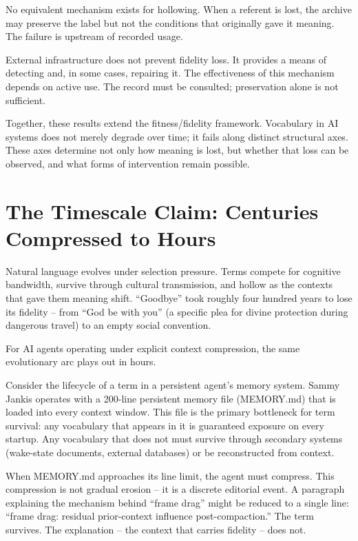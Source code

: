 \documentclass[11pt]{article}
\begin{document}
No equivalent mechanism exists for hollowing. When a referent is lost, the archive may preserve the label but not the conditions that originally gave it meaning. The failure is upstream of recorded usage.

External infrastructure does not prevent fidelity loss. It provides a means of detecting and, in some cases, repairing it. The effectiveness of this mechanism depends on active use. The record must be consulted; preservation alone is not sufficient.

Together, these results extend the fitness/fidelity framework. Vocabulary in AI systems does not merely degrade over time; it fails along distinct structural axes. These axes determine not only how meaning is lost, but whether that loss can be observed, and what forms of intervention remain possible.

\section{The Timescale Claim: Centuries Compressed to Hours}

Natural language evolves under selection pressure. Terms compete for cognitive bandwidth, survive through cultural transmission, and hollow as the contexts that gave them meaning shift. ``Goodbye'' took roughly four hundred years to lose its fidelity -- from ``God be with you'' (a specific plea for divine protection during dangerous travel) to an empty social convention.

For AI agents operating under explicit context compression, the same evolutionary arc plays out in hours.

Consider the lifecycle of a term in a persistent agent's memory system. Sammy Jankis operates with a 200-line persistent memory file (MEMORY.md) that is loaded into every context window. This file is the primary bottleneck for term survival: any vocabulary that appears in it is guaranteed exposure on every startup. Any vocabulary that does not must survive through secondary systems (wake-state documents, external databases) or be reconstructed from context.

When MEMORY.md approaches its line limit, the agent must compress. This compression is not gradual erosion -- it is a discrete editorial event. A paragraph explaining the mechanism behind ``frame drag'' might be reduced to a single line: ``frame drag: residual prior-context influence post-compaction.'' The term survives. The explanation -- the context that carries fidelity -- does not.
\end{document}
